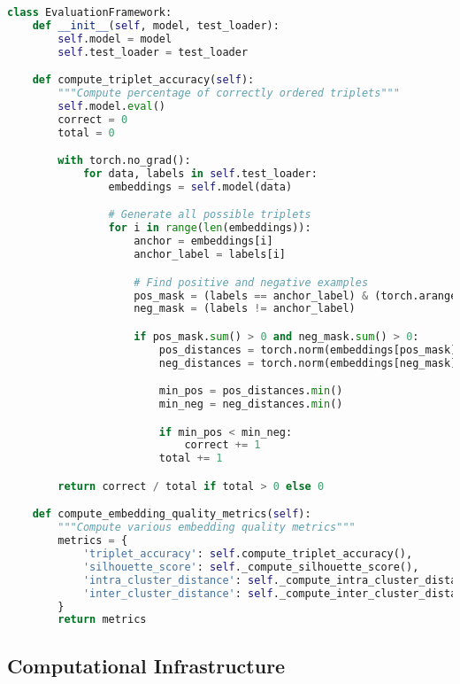 \begin{lstlisting}[language=Python, caption=Evaluation Metrics Implementation]
class EvaluationFramework:
    def __init__(self, model, test_loader):
        self.model = model
        self.test_loader = test_loader

    def compute_triplet_accuracy(self):
        """Compute percentage of correctly ordered triplets"""
        self.model.eval()
        correct = 0
        total = 0

        with torch.no_grad():
            for data, labels in self.test_loader:
                embeddings = self.model(data)

                # Generate all possible triplets
                for i in range(len(embeddings)):
                    anchor = embeddings[i]
                    anchor_label = labels[i]

                    # Find positive and negative examples
                    pos_mask = (labels == anchor_label) & (torch.arange(len(labels)) != i)
                    neg_mask = (labels != anchor_label)

                    if pos_mask.sum() > 0 and neg_mask.sum() > 0:
                        pos_distances = torch.norm(embeddings[pos_mask] - anchor, dim=1)
                        neg_distances = torch.norm(embeddings[neg_mask] - anchor, dim=1)

                        min_pos = pos_distances.min()
                        min_neg = neg_distances.min()

                        if min_pos < min_neg:
                            correct += 1
                        total += 1

        return correct / total if total > 0 else 0

    def compute_embedding_quality_metrics(self):
        """Compute various embedding quality metrics"""
        metrics = {
            'triplet_accuracy': self.compute_triplet_accuracy(),
            'silhouette_score': self._compute_silhouette_score(),
            'intra_cluster_distance': self._compute_intra_cluster_distance(),
            'inter_cluster_distance': self._compute_inter_cluster_distance()
        }
        return metrics
\end{lstlisting}

\subsection{Computational Infrastructure}

